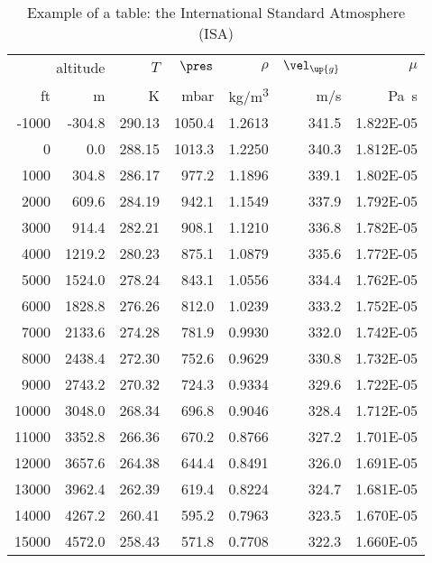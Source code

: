 \label{ch:isa}

\begin{table}[ht!]\centering
	\caption{Example of a table: the International Standard Atmosphere (ISA)}\label{tab:isa}
	\begin{tabular}{rrrrrrr}
		\toprule
		\multicolumn{2}{r}{altitude} &  $T$ & $\pres$ &   $\rho$ &  $\vel_\up{g}$ &  $\mu$ \\[+1.5ex] %
		ft   & m    &  K    &  mbar  & \si{kg/m^3} &  m/s &  \si{\pascal\second} \\ [+1.5ex] 
        	-1000	&	-304.8	&	290.13	&	1050.4	&	1.2613	&	341.5	&	1.822E-05	\\
        	0	    &	0.0	    &	288.15	&	1013.3	&	1.2250	&	340.3	&	1.812E-05	\\
        	1000	&	304.8	&	286.17	&	977.2	&	1.1896	&	339.1	&	1.802E-05	\\
        	2000	&	609.6	&	284.19	&	942.1	&	1.1549	&	337.9	&	1.792E-05	\\
        	3000	&	914.4	&	282.21	&	908.1	&	1.1210	&	336.8	&	1.782E-05	\\
        	4000	&	1219.2	&	280.23	&	875.1	&	1.0879	&	335.6	&	1.772E-05	\\
        	5000	&	1524.0	&	278.24	&	843.1	&	1.0556	&	334.4	&	1.762E-05	\\
        	6000	&	1828.8	&	276.26	&	812.0	&	1.0239	&	333.2	&	1.752E-05	\\
        	7000	&	2133.6	&	274.28	&	781.9	&	0.9930	&	332.0	&	1.742E-05	\\
        	8000	&	2438.4	&	272.30	&	752.6	&	0.9629	&	330.8	&	1.732E-05	\\
        	9000	&	2743.2	&	270.32	&	724.3	&	0.9334	&	329.6	&	1.722E-05	\\
        	10000	&	3048.0	&	268.34	&	696.8	&	0.9046	&	328.4	&	1.712E-05	\\
        	11000	&	3352.8	&	266.36	&	670.2	&	0.8766	&	327.2	&	1.701E-05	\\
        	12000	&	3657.6	&	264.38	&	644.4	&	0.8491	&	326.0	&	1.691E-05	\\
        	13000	&	3962.4	&	262.39	&	619.4	&	0.8224	&	324.7	&	1.681E-05	\\
        	14000	&	4267.2	&	260.41	&	595.2	&	0.7963	&	323.5	&	1.670E-05	\\
        	15000	&	4572.0	&	258.43	&	571.8	&	0.7708	&	322.3	&	1.660E-05	\\

\end{tabular}
\end{table}

